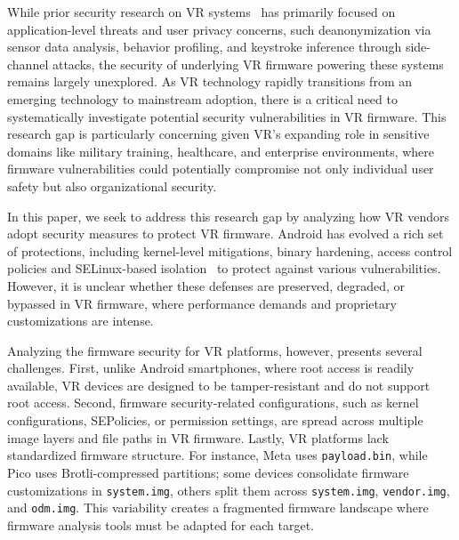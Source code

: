 \documentclass[sigconf]{acmart}
\newcommand{\bheading}[1]{{\vspace{2pt}\noindent{\textbf{#1}}}}
\newcommand{\cc}[1]{\mbox{\smaller[0.5]\texttt{#1}}}
\begin{document}
While prior security research on VR systems~\cite{miller2022combining,liebers2021understanding,olade2020biomove,pfeuffer2019behavioural,tricomi2022you,kumar2022passwalk,zhang2023s,nair2022exploring,slocum2023going, luo2022holologger,al2021vr,meteriz2022keylogging,su_remote_2024,luo_eavesdropping_2024,nguyen_penetration_2024,jarin2023behavr}
has primarily focused on application-level threats and user privacy concerns, such deanonymization via sensor data analysis, behavior profiling, and keystroke inference through side-channel attacks, the security of underlying VR firmware powering these systems remains largely unexplored.
As VR technology rapidly transitions from an emerging technology to mainstream adoption, there is a critical need to systematically investigate potential security vulnerabilities in VR firmware. 
This research gap is particularly concerning given VR's expanding role in sensitive domains like military training, healthcare, and enterprise environments, where firmware vulnerabilities could potentially compromise not only individual user safety but also organizational security.

In this paper, we seek to address this research gap by analyzing how VR vendors adopt security measures to protect VR firmware.
Android has evolved a rich set of protections, including kernel-level mitigations, binary hardening, access control policies and SELinux-based isolation~\cite{maar2024defects, smalley2013security, androidPermissions, android_native_code_risks}
to protect against various vulnerabilities.
However, it is unclear whether these defenses are preserved, degraded, or bypassed in VR firmware, where performance demands and proprietary customizations are intense.

\bheading{Challenges.}
Analyzing the firmware security for VR platforms, however, presents several challenges.
First, unlike Android smartphones, where root access is readily available, VR devices are designed to be tamper-resistant and do not support root access.
Second, firmware security-related configurations, such as kernel configurations, SEPolicies, or permission settings, are spread across multiple image layers and file paths in VR firmware.
Lastly, VR platforms lack standardized firmware structure.
For instance, Meta uses \cc{payload.bin}, while Pico uses Brotli-compressed partitions; some devices consolidate firmware customizations in \cc{system.img}, others split them across \cc{system.img}, \cc{vendor.img}, and \cc{odm.img}. This variability creates a fragmented firmware landscape where firmware analysis tools must be adapted for each target.
\end{document}
